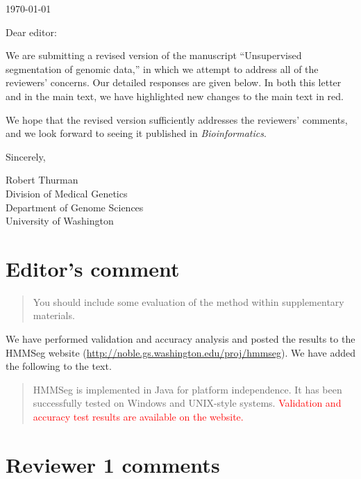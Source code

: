 \documentclass{article}
\newcommand{\breview}{\begin{quotation}\begin{em}\noindent}
\newcommand{\ereview}{\end{em}\end{quotation}}
\begin{document}
\hspace*{3.0in}\today

\vspace*{3ex}

\noindent
Dear editor:

\vspace*{1ex}

We are submitting a revised version of the manuscript ``Unsupervised
segmentation of genomic data,'' in which we attempt to address all of
the reviewers' concerns.  Our detailed responses are given below.  In
both this letter and in the main text, we have highlighted new changes
to the main text in red.

We hope that the revised version sufficiently addresses the reviewers'
comments, and we look forward to seeing it published in {\em
Bioinformatics}.

\vspace*{1ex}

\noindent
Sincerely,

\hspace*{1ex}

\noindent
Robert Thurman\\
Division of Medical Genetics\\
Department of Genome Sciences\\
University of Washington


\section*{Editor's comment}

\breview You should include some evaluation of the method within
supplementary materials.  \ereview

We have performed validation and accuracy analysis and posted the
results to the HMMSeg website
(\url{http://noble.gs.washington.edu/proj/hmmseg}).  We have added the
following to the text.

\begin{quotation}
HMMSeg is implemented in Java for platform independence.  It has been
successfully tested on Windows and UNIX-style
systems. \textcolor{red}{Validation and accuracy test results are
available on the website.}
\end{quotation}

\section*{Reviewer 1 comments}
\end{document}
